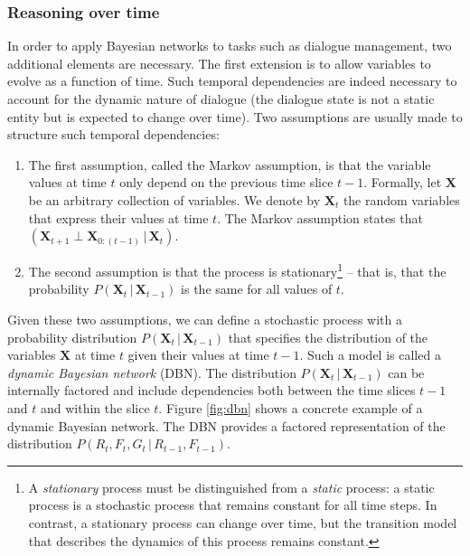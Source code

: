 \subsubsection*{Reasoning over time}

In order to apply Bayesian networks to tasks such as dialogue management, two additional elements are necessary. The first extension is to allow variables to evolve as a function of time.  Such temporal dependencies are indeed necessary to account for the dynamic nature of dialogue (the dialogue state is not a static entity but is expected to change over time). Two assumptions are usually made to structure such temporal dependencies: \begin{enumerate}
\item The first assumption, called the Markov assumption, is that the variable values at time $t$ only depend on the previous time slice $t\!-\!1$.  Formally, let $\mathbf{X}$ be an arbitrary collection of variables. We denote by $\mathbf{X}_t$ the random variables that express their values at time $t$.  The Markov assumption states that $(\mathbf{X}_{t+1} \; \bot \; \mathbf{X}_{0:(t-1)}  \, | \,  \mathbf{X}_{t})$.  

\item The second assumption is that the process is stationary\footnote{A \textit{stationary} process must be distinguished from a \textit{static} process: a static process is a stochastic process that remains constant for all time steps. In contrast, a stationary process can change over time, but the transition model that describes the dynamics of this process remains constant.} -- that is, that the probability $P(\mathbf{X}_t  \, | \,  \mathbf{X}_{t\!-\!1})$ is the same for all values of $t$.
\end{enumerate}

Given these two assumptions, we can define a stochastic process with a probability distribution $P(\mathbf{X}_t  \, | \,  \mathbf{X}_{t\!-\!1})$ that specifies the distribution of the variables $\mathbf{X}$ at time $t$ given their values at time $t\!-\!1$. Such a model is called a \textit{dynamic Bayesian network} (DBN). The distribution $P(\mathbf{X}_t  \, | \,  \mathbf{X}_{t\!-\!1})$ can be internally factored and include dependencies both between the time slices $t\!-\!1$ and $t$ and within the slice $t$.  Figure \ref{fig:dbn} shows a concrete example of a dynamic Bayesian network. The DBN provides a factored representation of the distribution  $P(R_t, F_t, G_t \, | \, R_{t\!-\!1}, F_{t\!-\!1})$.  

